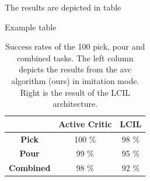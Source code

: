 The results are depicted in table

\begin{table}
    \centering
    \caption{Example table}
    \begin{tabular}{|c|c|c|}
        \cline{2-3}
        \multicolumn{1}{c|}{} & \textbf{Active Critic} & \textbf{LCIL} \\ \hline
        \textbf{Pick} & 100 \% & 98 \% \\ \hline
        \textbf{Pour} & 99 \% & 95 \% \\ \hline
        \textbf{Combined} & 98 \% & 92 \% \\ \hline
    \end{tabular}
    \caption{Success rates of the 100 pick, pour and combined tasks. The left column depicts the results from the \ac{avc} algorithm (ours) in 
    imitation mode. Right is the result of the LCIL architecture.}
\end{table}

